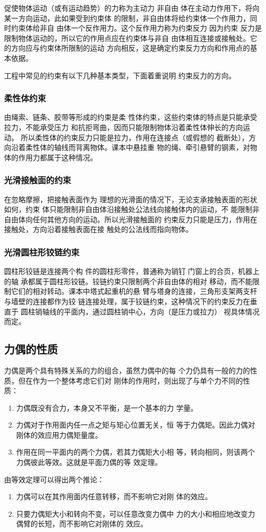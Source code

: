 促使物体运动（或有运动趋势）的力称为主动力 非自由
体在主动力作用下，将向某一方向运动，此如果受到约束体
的限制，非自由体将给约束体一个作用力，同时约束体给非自
由体一个反作用力。这个反作用力称为约束反力 因为约束
反力是限制物体运动的，所以它的作用点应在约束体与非自
由体相互连接或接触处。它的方向应与约束体所限制的运动
方向相反，这是确定约束反力方向和作用点的基本依据。

工程中常见的约束有以下几种基本类型，下面着重说明
约束反力的方向。

\subsubsection{柔性体约束}

由绳索、链条、胶带等形成的约束是柔
性体约束，这些约束体的特点是只能承受拉力，不能承受压力
和抗拒弯曲，因而只能限制物体沿着柔性体伸长的方向运动。
所以柔性体的约束反力只能是拉力，作用在连接点（或假想的
截断处），方向沿着柔性体的轴线而背离物体。课本中悬挂重
物的绳、牵引悬臂的钢素，对物体的作用力都属于这种情况。

\subsubsection{光滑接触面的约束}

在忽略摩擦，把接触表面作为
理想的光滑面的情况下，无论支承接触表面的形状如何，约束
体只能限制非自由体沿接触处公法线向接触体内的运动，不
能限制非自由体向任何其他方向的运动。所以光滑接触面的
约束反力只能是压力，作用在接触处，方向沿着接触表面在接
触处的公法线而指向物体。

\subsubsection{光滑圆柱形铰链约束}

圆柱形铰链是连接两个构
件的圆柱形零件，普通称为销钉 门窗上的合页，机器上的轴
承都属于圆柱形铰链。铰链约束只限制两个非自由体的相对
移动，而不能限制它们的相对转动。课本中塔式起重机的悬
臂与塔身的连接，三角形支架两支杆与墙壁的连接都作为铰
链连接处理，属于铰链约束，这种情况下的约束反力在垂直于
圆柱销轴线的平面内，通过圆柱销中心，方向（是压力或拉力）
视具体情况而定。

\subsection{力偶的性质}
力偶是两个具有特殊关系的力的组合，虽然力偶中的每
个力仍具有一般的力的性质，但在作为一个整体考虑它们对
刚体的作用时，则出现了与单个力不同的性质：
\begin{enumerate}
\item 力偶既没有合力，本身又不平衡，是一个基本的力
学量。
\item 力偶对于作用面内任一点之矩与矩心位置无关，恒
等于力偶矩。因此力偶对刚体的效应用力偶矩量度。
\item 作用在同一平面内的两个力偶，若其力偶矩大小相
等，转向相同，则该两个力偶彼此等效。这就是平面力偶的等
效定理。
\end{enumerate}

由等效定理可以得出两个推论：
\begin{enumerate}
\item 力偶可以在其作用面内任意转移，而不影响它对刚
体的效应。
\item 只要力偶矩大小和转向不变，可以任意改变力偶中
力的大小和相应地改变力偶臂的长短，而不影响它对刚体的
效应。
\end{enumerate}





